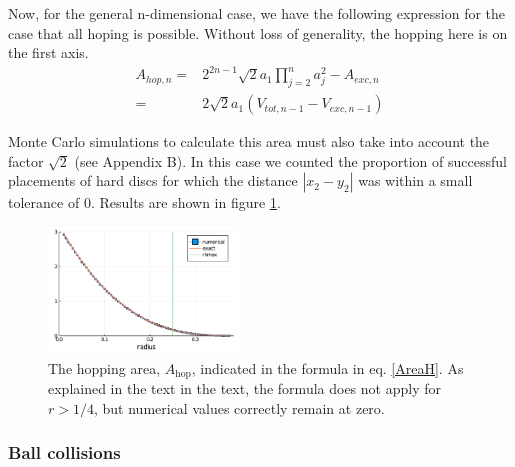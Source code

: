 \documentclass[superscriptaddress,pre,reprint,showpacs,twocolumn]{revtex4-1}
\begin{document}
Now, for the general n-dimensional case, we have the following
expression for the case that all hoping is possible.
Without loss of generality, the hopping here is on the first axis.
\begin{equation}
  \begin{split}
    A_{hop,n}  = & 2^{2n-1}\sqrt{2}a_1\prod_{j=2}^n a_j^2-A_{exc,n} \\
      = & 2 \sqrt{2}a_1 (V_{tot,n-1} - V_{exc,n-1})
  \end{split} 
\end{equation}

Monte Carlo simulations to calculate this area must also
take into account the factor $\sqrt{2}$ (see Appendix B).
In this case we counted the proportion of successful placements of hard discs 
for which the distance 
$|x_2 - y_2|$ was within a small tolerance of $0$. 
Results are shown in figure \ref{AreaHopp01}.


\begin{figure}[h]
\centering
\includegraphics[width=0.45\textwidth]{./figures/areaHopvertical01.pdf}
\caption{The hopping area, $A_\text{hop}$, 
  indicated in the formula in eq. \ref{AreaH}. As explained in the text
in the text, the formula does not apply for $r>1/4$, but numerical values correctly
remain at zero.}
\label{AreaHopp01}
\end{figure}


\subsubsection{Ball collisions}
\end{document}
